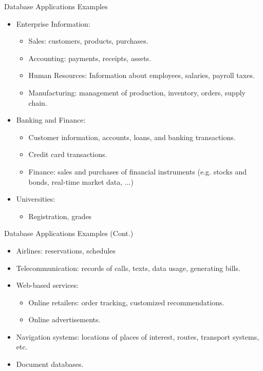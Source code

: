 \documentclass[aspectratio=169]{beamer}
\begin{document}
\begin{frame}{Database Applications Examples}
\begin{itemize}
    \item Enterprise Information:
    \begin{itemize}
        \item Sales: \pause customers, products, purchases.
        \item Accounting: \pause payments, receipts, assets.
        \item Human Resources: \pause Information about employees, salaries, payroll taxes.
        \item Manufacturing: \pause management of production, inventory, orders, supply chain.
    \end{itemize}
    \item Banking and Finance:
    \begin{itemize}
        \item \pause Customer information, accounts, loans, and banking transactions.
        \item \pause Credit card transactions.
        \item Finance: \pause sales and purchases of financial instruments (e.g. stocks and bonds, real-time market data, ...)
    \end{itemize}
    \item Universities: \pause
    \begin{itemize}
        \item Registration, grades
    \end{itemize}
\end{itemize}
\end{frame}

\begin{frame}{Database Applications Examples (Cont.)}
    \begin{itemize}
        \item Airlines: \pause reservations, schedules
        \item Telecommunication: \pause records of calls, texts, data usage, generating bills.
        \item Web-based services: \pause
        \begin{itemize}
            \item Online retailers: order tracking, customized recommendations.
            \item Online advertisements.
        \end{itemize} \pause
        \item Navigation systems: \pause locations of places of interest, routes, transport systems, etc.
        \pause
        \item Document databases.
    \end{itemize}
\end{frame}
\end{document}
